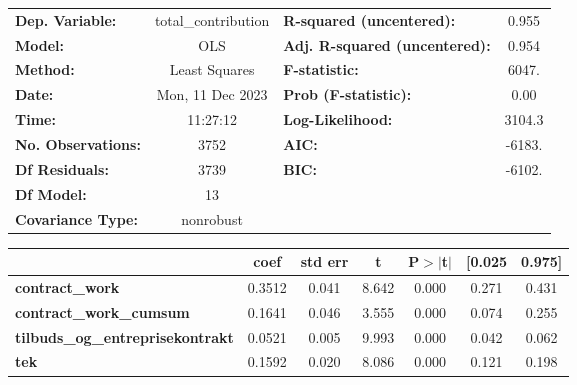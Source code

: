 \begin{center}
\begin{tabular}{lclc}
\toprule
\textbf{Dep. Variable:}                  & total\_contribution & \textbf{  R-squared (uncentered):}      &     0.955   \\
\textbf{Model:}                          &         OLS         & \textbf{  Adj. R-squared (uncentered):} &     0.954   \\
\textbf{Method:}                         &    Least Squares    & \textbf{  F-statistic:       }          &     6047.   \\
\textbf{Date:}                           &   Mon, 11 Dec 2023  & \textbf{  Prob (F-statistic):}          &     0.00    \\
\textbf{Time:}                           &       11:27:12      & \textbf{  Log-Likelihood:    }          &    3104.3   \\
\textbf{No. Observations:}               &          3752       & \textbf{  AIC:               }          &    -6183.   \\
\textbf{Df Residuals:}                   &          3739       & \textbf{  BIC:               }          &    -6102.   \\
\textbf{Df Model:}                       &            13       & \textbf{                     }          &             \\
\textbf{Covariance Type:}                &      nonrobust      & \textbf{                     }          &             \\
\bottomrule
\end{tabular}
\begin{tabular}{lcccccc}
                                         & \textbf{coef} & \textbf{std err} & \textbf{t} & \textbf{P$> |$t$|$} & \textbf{[0.025} & \textbf{0.975]}  \\
\midrule
\textbf{contract\_work}                  &       0.3512  &        0.041     &     8.642  &         0.000        &        0.271    &        0.431     \\
\textbf{contract\_work\_cumsum}          &       0.1641  &        0.046     &     3.555  &         0.000        &        0.074    &        0.255     \\
\textbf{tilbuds\_og\_entreprisekontrakt} &       0.0521  &        0.005     &     9.993  &         0.000        &        0.042    &        0.062     \\
\textbf{tek}                             &       0.1592  &        0.020     &     8.086  &         0.000        &        0.121    &        0.198     \\

\end{tabular}
\end{center}

